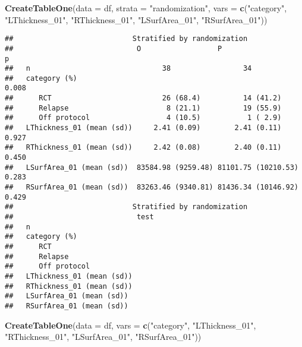 \documentclass[]{article}
\newenvironment{Shaded}{\begin{snugshade}}{\end{snugshade}}
\newcommand{\KeywordTok}[1]{\textcolor[rgb]{0.13,0.29,0.53}{\textbf{#1}}}
\newcommand{\DataTypeTok}[1]{\textcolor[rgb]{0.13,0.29,0.53}{#1}}
\newcommand{\StringTok}[1]{\textcolor[rgb]{0.31,0.60,0.02}{#1}}
\newcommand{\NormalTok}[1]{#1}
\theoremstyle{definition}
\theoremstyle{definition}
\theoremstyle{definition}
\theoremstyle{remark}
\begin{document}
\begin{Shaded}
\begin{Highlighting}[]
\KeywordTok{CreateTableOne}\NormalTok{(}\DataTypeTok{data =}\NormalTok{ df,}
               \DataTypeTok{strata =} \StringTok{"randomization"}\NormalTok{,}
               \DataTypeTok{vars =} \KeywordTok{c}\NormalTok{(}\StringTok{"category"}\NormalTok{, }\StringTok{"LThickness_01"}\NormalTok{, }\StringTok{"RThickness_01"}\NormalTok{, }\StringTok{"LSurfArea_01"}\NormalTok{, }\StringTok{"RSurfArea_01"}\NormalTok{))}
\end{Highlighting}
\end{Shaded}

\begin{verbatim}
##                            Stratified by randomization
##                             O                  P                   p     
##   n                               38                 34                  
##   category (%)                                                      0.008
##      RCT                          26 (68.4)          14 (41.2)           
##      Relapse                       8 (21.1)          19 (55.9)           
##      Off protocol                  4 (10.5)           1 ( 2.9)           
##   LThickness_01 (mean (sd))     2.41 (0.09)        2.41 (0.11)      0.927
##   RThickness_01 (mean (sd))     2.42 (0.08)        2.40 (0.11)      0.450
##   LSurfArea_01 (mean (sd))  83584.98 (9259.48) 81101.75 (10210.53)  0.283
##   RSurfArea_01 (mean (sd))  83263.46 (9340.81) 81436.34 (10146.92)  0.429
##                            Stratified by randomization
##                             test
##   n                             
##   category (%)                  
##      RCT                        
##      Relapse                    
##      Off protocol               
##   LThickness_01 (mean (sd))     
##   RThickness_01 (mean (sd))     
##   LSurfArea_01 (mean (sd))      
##   RSurfArea_01 (mean (sd))
\end{verbatim}

\begin{Shaded}
\begin{Highlighting}[]
\KeywordTok{CreateTableOne}\NormalTok{(}\DataTypeTok{data =}\NormalTok{ df,}
               \DataTypeTok{vars =} \KeywordTok{c}\NormalTok{(}\StringTok{"category"}\NormalTok{, }\StringTok{"LThickness_01"}\NormalTok{, }\StringTok{"RThickness_01"}\NormalTok{, }\StringTok{"LSurfArea_01"}\NormalTok{, }\StringTok{"RSurfArea_01"}\NormalTok{))}
\end{Highlighting}
\end{Shaded}
\end{document}
